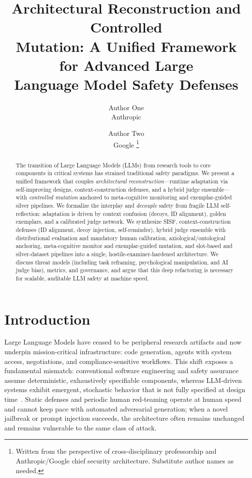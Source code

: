 \documentclass[letterpaper,twocolumn,10pt]{article}
\title{\Large \bf Architectural Reconstruction and Controlled\\
  Mutation: A Unified Framework for Advanced Large\\
  Language Model Safety Defenses}
\author{
{\rm Author One}\\
Anthropic \and
{\rm Author Two}\\
Google
\thanks{Written from the perspective of cross-disciplinary professorship and Anthropic/Google chief security architecture. Substitute author names as needed.}
}
\date{}
\begin{document}
\maketitle

\begin{abstract}
The transition of Large Language Models (LLMs) from research tools to core components in critical systems has strained traditional safety paradigms. We present a unified framework that couples \emph{architectural reconstruction}---runtime adaptation via self-improving designs, context-construction defenses, and a hybrid judge ensemble---with \emph{controlled mutation} anchored to meta-cognitive monitoring and exemplar-guided silver pipelines. We formalize the interplay and \emph{decouple} safety from fragile LLM self-reflection: adaptation is driven by context confusion (decoys, ID alignment), golden exemplars, and a calibrated judge network. We synthesize SISF, context-construction defenses (ID alignment, decoy injection, self-reminder), hybrid judge ensemble with distributional evaluation and mandatory human calibration, axiological/ontological anchoring, meta-cognitive monitor and exemplar-guided mutation, and slot-based and silver-dataset pipelines into a single, hostile-examiner-hardened architecture. We discuss threat models (including task reframing, psychological manipulation, and AI judge bias), metrics, and governance, and argue that this deep refactoring is necessary for scalable, auditable LLM safety at machine speed.
\end{abstract}

\section{Introduction}

Large Language Models have ceased to be peripheral research artifacts and now underpin mission-critical infrastructure: code generation, agents with system access, negotiations, and compliance-sensitive workflows. This shift exposes a fundamental mismatch: conventional software engineering and safety assurance assume deterministic, exhaustively specifiable components, whereas LLM-driven systems exhibit emergent, stochastic behavior that is not fully specified at design time~\cite{sisf-arxiv,agentos-arxiv}. Static defenses and periodic human red-teaming operate at human speed and cannot keep pace with automated adversarial generation; when a novel jailbreak or prompt injection succeeds, the architecture often remains unchanged and remains vulnerable to the same class of attack.
\end{document}
